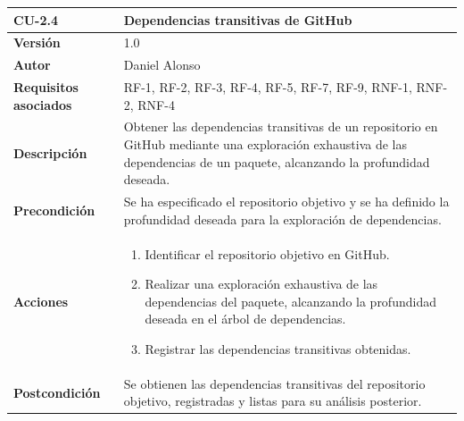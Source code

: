 \begin{table}[h!]
	\centering
	\begin{tabularx}{\linewidth}{ p{} p{} }
		\toprule
		\textbf{CU-2.4}               & \textbf{Dependencias transitivas de GitHub}                                                                                                                                \\
		\toprule
		\textbf{Versión}              & 1.0                                                                                                                                                                        \\
		\textbf{Autor}                & Daniel Alonso                                                                                                                                                              \\
		\textbf{Requisitos asociados} & RF-1, RF-2, RF-3, RF-4, RF-5, RF-7, RF-9, RNF-1, RNF-2, RNF-4                                                                                                                                                     \\
		\textbf{Descripción}          & Obtener las dependencias transitivas de un repositorio en GitHub mediante una exploración exhaustiva de las dependencias de un paquete, alcanzando la profundidad deseada. \\
		\textbf{Precondición}         & Se ha especificado el repositorio objetivo y se ha definido la profundidad deseada para la exploración de dependencias.                                                    \\
		\textbf{Acciones}             & \begin{enumerate}
			                                \item Identificar el repositorio objetivo en GitHub.
			                                \item Realizar una exploración exhaustiva de las dependencias del paquete, alcanzando la profundidad deseada en el árbol de dependencias.
			                                \item Registrar las dependencias transitivas obtenidas.
		                                \end{enumerate}                                   \\
		\textbf{Postcondición}        & Se obtienen las dependencias transitivas del repositorio objetivo, registradas y listas para su análisis posterior.                                                        \\

\end{tabularx}
\end{table}
